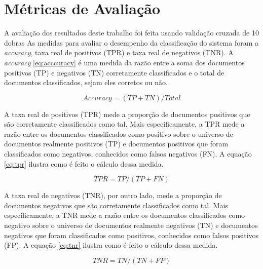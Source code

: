 \section{Métricas de Avaliação}

A avaliação dos resultados deste trabalho foi feita usando validação cruzada de 10 dobras  As medidas para avaliar o desempenho da classificação do sistema foram a \textit{accuracy}, taxa real de positivos (TPR) e taxa real de negativos (TNR). A \textit{accuracy} \ref{eq:acccuracy} é uma medida da razão entre a soma dos documentos positivos (TP) e negativos (TN) corretamente classificados e o total de documentos classificados, sejam eles corretos ou não.

\begin{equation}
Accuracy =  (TP + TN) / Total
\label{eq:acccuracy}
\end{equation}


A taxa real de positivos (TPR) mede a proporção de documentos positivos que são corretamente classificados como tal. Mais especificamente, a TPR mede a razão entre os documentos classificados como positivo sobre o universo de documentos realmente positivos (TP) e documentos positivos que foram classificados como negativos, conhecidos como falsos negativos (FN). A equação \ref{eq:tpr} ilustra como é feito o cálculo dessa medida. 

\begin{equation}
TPR = TP / (TP + FN)
\label{eq:tpr}
\end{equation}

A taxa real de negativos (TNR), por outro lado, mede a proporção de documentos negativos que são corretamente classificados como tal. Mais especificamente, a TNR mede a razão entre os documentos classificados como negativo sobre o universo de documentos realmente negativos (TN) e documentos negativos que foram classificados como positivos, conhecidos como falsos positivos (FP). A equação \ref{eq:tnr} ilustra como é feito o cálculo dessa medida. 

\begin{equation}
TNR = TN / (TN + FP)
\label{eq:tnr}
\end{equation}

